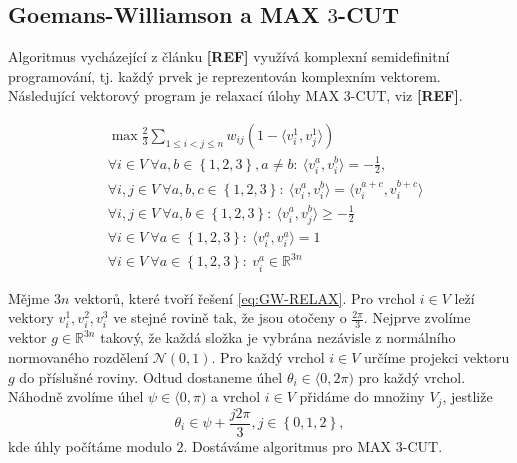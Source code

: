 \subsection{Goemans-Williamson a MAX $3$-CUT}

Algoritmus vycházející z článku \textbf{[REF]} využívá komplexní semidefinitní programování, tj. každý prvek je reprezentován komplexním vektorem. Následující vektorový program je relaxací úlohy MAX $3$-CUT, viz \textbf{[REF]}. 

\begin{equation}\tag{GW-RELAX}
    \begin{split}
        &\max \frac{2}{3} \sum_{1 \leq i < j \leq n} w_{ij} (1 - \langle v_i^1, v_j^1 \rangle) \\
        &\forall i \in V\ \forall a,b \in \left\{ 1,2,3 \right\}, a \neq b:\ \langle v_i^a, v_i^b \rangle = -\frac{1}{2}, \\
        &\forall i,j \in V\ \forall a,b,c \in \left\{ 1,2,3 \right\}:\ \langle v_i^a, v_i^b \rangle = \langle v_i^{a+c}, v_i^{b+c} \rangle \\
        &\forall i,j \in V\ \forall a,b \in \left\{ 1,2,3 \right\}:\ \langle v_i^a, v_j^b \rangle \geq -\frac{1}{2} \\
        &\forall i \in V\ \forall a \in \left\{ 1,2,3 \right\}:\ \langle v_i^a, v_i^a \rangle = 1 \\
        &\forall i \in V\ \forall a \in \left\{ 1,2,3 \right\}:\ v_i^a \in \mathbb{R}^{3n}
    \end{split}
    \label{eq:GW-RELAX}
\end{equation}


Mějme $3n$ vektorů, které tvoří řešení \ref{eq:GW-RELAX}. Pro vrchol $i \in V$ leží vektory $v_i^1, v_i^2, v_i^3$ ve stejné rovině tak, že jsou otočeny o $\frac{2\pi}{3}$. Nejprve zvolíme vektor $g \in \mathbb{R}^{3n}$ takový, že každá složka je vybrána nezávisle z normálního normovaného rozdělení $\mathcal{N}(0,1)$. Pro každý vrchol $i \in V$ určíme projekci vektoru $g$ do příslušné roviny. Odtud dostaneme úhel $\theta_i \in \langle 0, 2\pi)$ pro každý vrchol. Náhodně zvolíme úhel $\psi \in \langle 0, \pi)$ a vrchol $i \in V$ přidáme do množiny $V_j$, jestliže
$$
    \theta_i \in \psi + \frac{j 2 \pi}{3}, j \in \left\{ 0, 1, 2 \right\},
$$
kde úhly počítáme modulo $2$. Dostáváme algoritmus pro MAX $3$-CUT.

